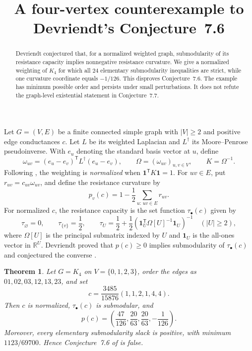 \documentclass[11pt]{amsart}
\title[A counterexample to Devriendt's Conjecture 7.6]
{A four-vertex counterexample to Devriendt's Conjecture~7.6}
\date{}
\newtheorem{theorem}{Theorem}
\theoremstyle{remark}
\newcommand{\one}{\mathbf{1}}
\begin{document}
\begin{abstract}
Devriendt conjectured that, for a normalized weighted graph, submodularity of
its resistance capacity implies nonnegative resistance curvature. We give a
normalized weighting of $K_4$ for which all $24$ elementary submodularity
inequalities are strict, while one curvature coordinate equals $-1/126$.
This disproves Conjecture~7.6. The example has minimum possible order and
persists under small perturbations. It does not refute the graph-level
existential statement in Conjecture~7.7.
\end{abstract}

\maketitle

Let $G=(V,E)$ be a finite connected simple graph with $|V|\ge2$ and positive
edge conductances $c$. Let $L$ be its weighted Laplacian and $L^\dagger$ its
Moore--Penrose pseudoinverse. With $e_u$ denoting the standard basis vector at
$u$, define
\[
 \omega_{uv}=(e_u-e_v)^{\mathsf T}L^\dagger(e_u-e_v),
 \qquad
 \Omega=(\omega_{uv})_{u,v\in V},
 \qquad
 K=\Omega^{-1}.
\]
Following \cite[Definitions~3.1, 5.1, and 7.1]{Devriendt}, the weighting is
\emph{normalized} when $\one^{\mathsf T}K\one=1$. For $uv\in E$, put
$r_{uv}=c_{uv}\omega_{uv}$, and define the resistance curvature by
\[
 p_v(c)=1-\frac12\sum_{u:\,uv\in E}r_{uv}.
\]
For normalized $c$, the resistance capacity is the set function
$\tau_\bullet(c)$ given by
\[
 \tau_\varnothing=0,
 \qquad
 \tau_{\{v\}}=\frac12,
 \qquad
 \tau_U=\frac12+\frac12
 \left(\one_U^{\mathsf T}\Omega[U]^{-1}\one_U\right)^{-1}
 \quad (|U|\ge2),
\]
where $\Omega[U]$ is the principal submatrix indexed by $U$ and $\one_U$ is
the all-ones vector in $\mathbb{R}^U$. Devriendt proved that
$p(c)\ge0$ implies submodularity of $\tau_\bullet(c)$ and conjectured the
converse \cite[Theorem~7.5 and Conjecture~7.6]{Devriendt}.

\begin{theorem}\label{thm:main}
Let $G=K_4$ on $V=\{0,1,2,3\}$, order the edges as
$01,02,03,12,13,23$, and set
\[
 c=\frac{3485}{15876}(1,1,2,1,4,4).
\]
Then $c$ is normalized, $\tau_\bullet(c)$ is submodular, and
\[
 p(c)=
 \left(
 \frac{47}{126},
 \frac{20}{63},
 \frac{20}{63},
 -\frac1{126}
 \right).
\]
Moreover, every elementary submodularity slack is positive, with minimum
$1123/69700$. Hence Conjecture~7.6 of \cite{Devriendt} is false.
\end{theorem}
\end{document}
